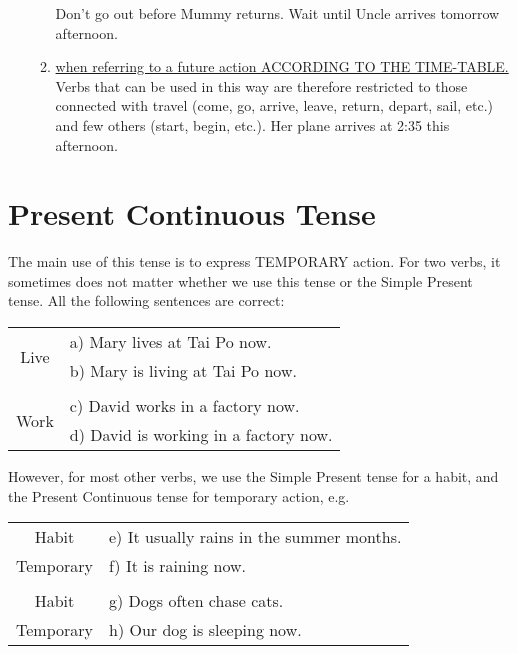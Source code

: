 \begin{enumerate}
\begin{enumerate}
                Don't go out before Mummy returns.
                \newline
                Wait until Uncle arrives tomorrow afternoon.
            \item \underline{when referring to a future action ACCORDING TO THE 
                TIME-TABLE.}
                \newline
                Verbs that can be used in this way are therefore restricted to
                those connected with travel (come, go, arrive, leave, return,
                depart, sail, etc.) and few others (start, begin, etc.).
                \newline
                Her plane arrives at 2:35 this afternoon.
        \end{enumerate}
\end{enumerate}

\newpage
\section{Present Continuous Tense}
The main use of this tense is to express TEMPORARY action.
For two verbs, it sometimes does not matter whether we use this tense or the
Simple Present tense.
All the following sentences are correct:
\begin{center}
\begin{tabular}{|cl|}
    \hline
    \multirow{2}{*}{Live} & a) Mary lives at Tai Po now. \\
                          & b) Mary is living at Tai Po now. \\ 
                          & \\
    \multirow{2}{*}{Work} & c) David works in a factory now. \\
                          & d) David is working in a factory now. \\ \hline
\end{tabular}
\end{center}

However, for most other verbs, we use the Simple Present tense for a habit,
and the Present Continuous tense for temporary action, e.g.
\begin{center}
\begin{tabular}{|cl|}
    \hline
    Habit     & e) It usually rains in the summer months. \\
    Temporary & f) It is raining now. \\
              & \\
    Habit     & g) Dogs often chase cats. \\
    Temporary & h) Our dog is sleeping now. \\ \hline
\end{tabular}
\end{center}

